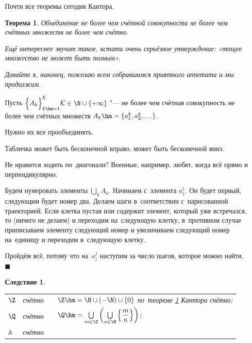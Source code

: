 \documentclass[a4paper,10pt,twoside]{article}
\newtheorem{The}{Теорема}[section]
\newtheorem{Sl}{Следствие}[section]
\newenvironment{Proof}
       {\par\noindent{\textbf{Доказательство.}}}
       {\hfill$\scriptstyle\blacksquare$}
\begin{document}
Почти все теоремы сегодня Кантора.

\begin{The}\label{Kantor}
Объединение не более чем счётной совокупности не более чем счётных множеств не более чем счётно.
\end{The}

\textit{Ещё интереснее звучит такое, кстати очень серьёзное утверждение: «тощее множество не может быть полным».}

\textit{Давайте я, наконец, пожелаю всем собравшимся приятного аппетита и мы продолжим.}

\begin{Proof}
Пусть $\Big\{A_k\Big\}_{k\hm=1}^{\mathcal{K}} \mathcal K\in\N\cup\{+\infty\}$ "--- не более
 чем счётная совокупность не более чем счётных множеств $A_k\hm=\{a_1^k,a_2^k,\ldots\}$.

Нужно их все прообъединять.


 Табличка может быть бесконечной вправо, может быть бесконечной вниз.

 Не нравится ходить по~диагонали? Военные, например, любят, когда всё прямо и перпендикулярно.


Будем нумеровать элементы $\bigcup\limits_k A_k$. Начинаем с~элемента $a_1^1$. Он будет первый,
 следующим будет номер два. Делаем шаги в~соответствии с~нарисованной траекторией.
  Если клетка пустая или содержит элемент, который уже встречался, то (ничего не делаем) и переходим на~следующую клетку, в~противном случае приписываем элементу
следующий номер и увеличиваем следующий номер на~единицу и переходим в~следующую клетку.



Пройдём всё, потому что на~$a^j_i$ наступим за число шагов, которое можно найти.
\end{Proof}

\begin{Sl}
\begin{tabular}{llll}
$\Z$&счётно& &$\Z\hm=\N\cup(-\N)\cup\{0\}$ по~теореме \ref{Kantor} Кантора счётно;\\
$\Q$&счётно& &$\Q\hm=\bigcup\limits_{m\in\Z}\left(\bigcup\limits_{n\in \N}\left\{\dfrac mn\right\}\right)$;\\ $\mathbb{A}$&счётно& &
\end{tabular}
\end{Sl}
\end{document}

